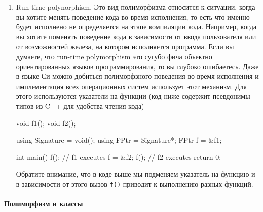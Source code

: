 \begin{enumerate}
\item Run-time polynorphism.
Это вид полиморфизма относится к ситуации, когда вы хотите менять поведение кода во время исполнения, то есть что именно будет исполнено не определяется на этапе компиляции кода.
Например, когда вы хотите поменять поведение кода в зависимости от ввода пользователя или от возможностей железа, на котором исполняется программа.
Если вы думаете, что run-time polymorphism это сугубо фича объектно ориентированных языков программирования, то вы глубоко ошибаетесь.
Даже в языке Си можно добиться полиморфзного поведения во время исполнения и имплементация всех операционных систем использует этот механизм.
Для этого используются указатели на функции (код ниже содержит псевдонимы типов из C++ для удобства чтения кода)
\begin{cppcode}
void f1();
void f2();

using Signature = void();
using FPtr = Signature*;
FPtr f = &f1;

int main() {
  f(); // f1 executes
  f = &f2;
  f(); // f2 executes
  return 0;
}
\end{cppcode}
Обратите внимание, что в коде выше мы подменяем указатель на функцию и в зависимости от этого вызов \texttt{f()} приводит к выполнению разных функций.
\end{enumerate}

\paragraph{Полиморфизм и классы}

